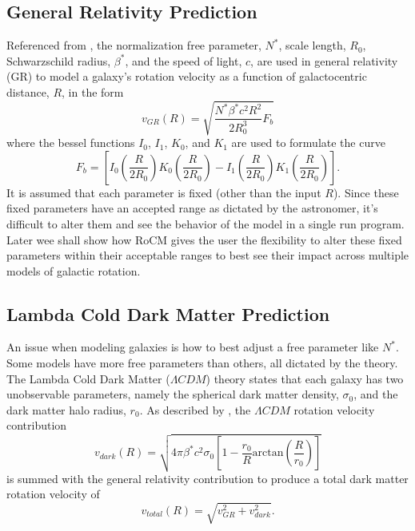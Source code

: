 \documentclass[conference]{IEEEtran-modified}
\begin{document}
\subsection{General Relativity Prediction}
Referenced from \cite{mannheim}, the normalization free parameter, $N^*$, scale length, $R_0$, Schwarzschild radius, $\beta^*$, and the speed of light, $c$, are used in general relativity (GR) to model a galaxy's rotation velocity as a function of galactocentric distance, $R$, in the form
\begin{equation}
v_{GR}(R) = \sqrt{\frac{N^*\beta^*c^2R^2}{2R^3_0}F_b}
\end{equation}
where the bessel functions $I_0$, $I_1$, $K_0$, and $K_1$ are used to formulate the curve
\begin{equation}
F_b = \left[I_0\left(\frac{R}{2R_0}\right)K_0\left(\frac{R}{2R_0}\right)-I_1\left(\frac{R}{2R_0}\right)K_1\left(\frac{R}{2R_0}\right)\right].
\end{equation}
It is assumed that each parameter is fixed (other than the input $R$). Since these fixed parameters have an accepted range as dictated by the astronomer, it's difficult to alter them and see the behavior of the model in a single run program.   Later wee shall show how RoCM gives the user the flexibility to alter these fixed parameters within their acceptable ranges to best see their impact across multiple models of galactic rotation. 


\subsection{Lambda Cold Dark Matter Prediction}
An issue when modeling galaxies is how to best adjust a free parameter like $N^*$. Some models have more free parameters than others, all dictated by the theory. The Lambda Cold Dark Matter ($\Lambda CDM$) theory states that each galaxy has two unobservable parameters, namely the spherical dark matter density, $\sigma_0$, and the dark matter halo radius, $r_0$. As described by \cite{mannheim}, the $\Lambda CDM$ rotation velocity contribution
\begin{equation}
v_{dark}(R) = \sqrt{4\pi\beta^*c^2\sigma_0\left[1-\frac{r_0}{R}\text{arctan}\left(\frac{R}{r_0}\right)\right]}
\end{equation}
is summed with the general relativity contribution to produce a total dark matter rotation velocity of 
\begin{equation}
v_{total}(R) = \sqrt{v_{GR}^2 + v_{dark}^2}.
\end{equation}
\end{document}
